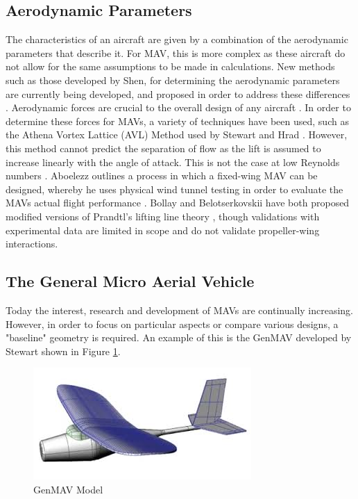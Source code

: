 \subsection{Aerodynamic Parameters}
\label{sec:AerodynamicParameters}
The characteristics of an aircraft are given by a combination of the aerodynamic parameters that describe it. For \acrshort{MAV}, this is more complex as these aircraft do not allow for the same assumptions to be made in calculations. New methods such as those developed by Shen, for determining the aerodynamic parameters are currently being developed, and proposed in order to address these differences \cite{Shen2018, Roberts2011}. Aerodynamic forces are crucial to the overall design of any aircraft \cite{Aero2012}. In order to determine these forces for \acrshort{MAV}s, a variety of techniques have been used, such as the Athena Vortex Lattice (\acrshort{AVL}) Method used by Stewart and Hrad \cite{Stewart2007, Hrad2010}. However, this method cannot predict the separation of flow as the lift is assumed to increase linearly with the angle of attack.  This is not the case at low Reynolds numbers \cite{Zhang2022}. Aboelezz outlines a process in which a fixed-wing \acrshort{MAV} can be designed, whereby he uses physical wind tunnel testing in order to evaluate the \acrshort{MAV}s actual flight performance \cite{Aboelezz2020}. Bollay and Belotserkovskii have both proposed modified versions of Prandtl's lifting line theory \cite{Bollay1939, Belotserkovskii1968}, though validations with experimental data are limited in scope and do not validate propeller-wing interactions.

\subsection{The General Micro Aerial Vehicle}
\label{subsec:GenMAV}
Today the interest, research and development of \acrshort{MAV}s are continually increasing. However, in order to focus on particular aspects or compare various designs, a "baseline" geometry is required. An example of this is the \acrshort{GenMAV} developed by Stewart \cite{Stewart2007} shown in Figure \ref{fig:genmav2}.

\begin{figure}[H]
    \centering
    \includegraphics[width=0.8\linewidth]{04_Progress/Figs/genMav.jpeg}
    \caption{GenMAV Model \cite{Stewart2007}}
    \label{fig:genmav2}
\end{figure}

